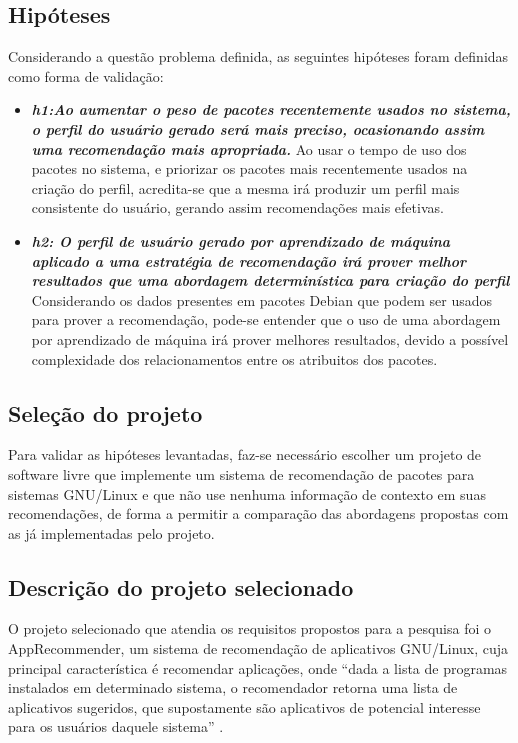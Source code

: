 \subsection{Hipóteses} \label{sec:hipoteses}

Considerando a questão problema definida, as seguintes hipóteses foram definidas
como forma de validação:

\begin{itemize} \item \textit{\textbf{h1:Ao aumentar o peso de pacotes
recentemente usados no sistema, o perfil do usuário gerado será mais preciso,
ocasionando assim uma recomendação mais apropriada.}} Ao usar o tempo de uso dos
pacotes no sistema, e priorizar os pacotes mais recentemente usados na criação
do perfil, acredita-se que a mesma irá produzir um perfil mais
consistente do usuário, gerando assim recomendações mais efetivas.\item
\textit{\textbf{h2: O perfil de usuário gerado por aprendizado de máquina aplicado a uma
estratégia de recomendação irá prover melhor resultados que uma abordagem
determinística para criação do perfil}}
Considerando os dados presentes em pacotes Debian que podem ser
usados para prover a recomendação, pode-se entender que o uso de uma abordagem
por aprendizado de máquina irá prover melhores resultados, devido a possível
complexidade dos relacionamentos entre os atribuitos dos pacotes.
\end{itemize}

\subsection{Seleção do projeto}

Para validar as hipóteses levantadas, faz-se necessário escolher um projeto de
software livre que implemente um sistema de recomendação de pacotes
para sistemas GNU/Linux e que não use nenhuma informação de contexto em suas
recomendações, de forma a permitir a comparação das abordagens propostas com as
já implementadas pelo projeto.

\subsection{Descrição do projeto selecionado}

O projeto selecionado que atendia os requisitos propostos para a pesquisa foi o AppRecommender,
um sistema de recomendação de aplicativos GNU/Linux, cuja principal característica é recomendar aplicações,
onde “dada a lista de programas instalados em determinado sistema, o recomendador retorna uma lista de aplicativos
sugeridos, que supostamente são aplicativos de potencial interesse para os usuários daquele sistema”
\cite{araujo2011apprecommender}.

